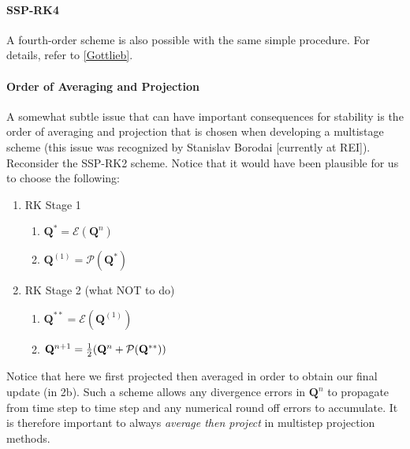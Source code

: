 \documentclass[11pt]{article}
\begin{document}
\paragraph{SSP-RK4} A fourth-order scheme is also possible with the same simple procedure.  For details, refer to \ref{Gottlieb}.

\paragraph{Order of Averaging and Projection} A somewhat subtle issue that can have important consequences for stability is the order of averaging and projection that is chosen when developing a multistage scheme (this issue was recognized by Stanislav Borodai [currently at REI]). Reconsider the SSP-RK2 scheme. Notice that it would have been plausible for us to choose the following:

\begin{enumerate}
\item RK Stage 1
    \begin{enumerate}
    \item $\mathbf{Q}^{*} = \mathcal{E}(\mathbf{Q}^n)$
    \item $\mathbf{Q}^{(1)} = \mathcal{P}(\mathbf{Q}^*)$
    \end{enumerate}
\item RK Stage 2 (what NOT to do)
    \begin{enumerate}
    \item $\mathbf{Q}^{**} = \mathcal{E}(\mathbf{Q}^{(1)})$
    \item $\mathbf{Q}^{n+1} = \mbox{$\frac{1}{2}$} (\mathbf{Q}^n + \mathcal{P}(\mathbf{Q}^{**}))$
    \end{enumerate}
\end{enumerate}

Notice that here we first projected then averaged in order to obtain our final update (in 2b).  Such a scheme allows any divergence errors in $\mathbf{Q}^n$ to propagate from time step to time step and any numerical round off errors to accumulate.  It is therefore important to always \emph{average then project} in multistep projection methods.
\end{document}
